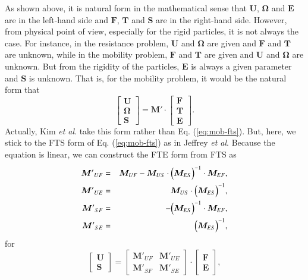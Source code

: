 \documentclass{book}
\begin{document}
As shown above, it is natural form in the mathematical sense
that $\bm{U}$, $\bm{\Omega}$ and $\bm{E}$ are in the left-hand side
and $\bm{F}$, $\bm{T}$ and $\bm{S}$ are in the right-hand side.
However, from physical point of view, especially for the rigid particles,
it is not always the case.
For instance, in the resistance problem,
$\bm{U}$ and $\bm{\Omega}$ are given and
$\bm{F}$ and $\bm{T}$ are unknown,
while in the mobility problem,
$\bm{F}$ and $\bm{T}$ are given and
$\bm{U}$ and $\bm{\Omega}$ are unknown.
But from the rigidity of the particles,
$\bm{E}$ is always a given parameter and
$\bm{S}$ is unknown.
That is, for the mobility problem, it would be the natural form that
\begin{equation}
  \left[
    \begin{array}{c}
      \bm{U}\\
      \bm{\Omega}\\
      \bm{S}
    \end{array}
  \right]
  =
  \bm{M}'
  \cdot
  \left[
    \begin{array}{c}
      \bm{F}\\
      \bm{T}\\
      \bm{E}
    \end{array}
  \right]
  .
\end{equation}
Actually, Kim {\it et al}.\cite{KimMifflin1985} take this form
rather than Eq. (\ref{eq:mob-fts}).
But, here, we stick to the FTS form of Eq. (\ref{eq:mob-fts})
as in Jeffrey {\it et al}.
Because the equation is linear,
we can construct the FTE form from FTS as
\begin{eqnarray}
  {\bm{M}'}_{UF}
  &=&
  \bm{M}_{UF}
  -
  \bm{M}_{US}
  \cdot
  \Bigl(
  \bm{M}_{ES}
  \Bigr)^{-1}
  \cdot
  \bm{M}_{EF}
  ,\\
  {\bm{M}'}_{UE}
  &=&
  \bm{M}_{US}
  \cdot
  \Bigl(
    \bm{M}_{ES}
  \Bigr)^{-1}
  ,\\
  {\bm{M}'}_{SF}
  &=&
  -
  \Bigl(
    \bm{M}_{ES}
  \Bigr)^{-1}
  \cdot
  \bm{M}_{EF}
  ,\\
  {\bm{M}'}_{SE}
  &=&
  \Bigl(
    \bm{M}_{ES}
  \Bigr)^{-1}
  ,
\end{eqnarray}
for
\begin{equation}
  \left[
    \begin{array}{c}
      \bm{U}\\
      \bm{S}
    \end{array}
  \right]
  =
  \left[
    \begin{array}{cc}
      {\bm{M}'}_{UF} & {\bm{M}'}_{UE}\\
      {\bm{M}'}_{SF} & {\bm{M}'}_{SE}
    \end{array}
  \right]
  \cdot
  \left[
    \begin{array}{c}
      \bm{F}\\
      \bm{E}
    \end{array}
  \right]
  ,
\end{equation}
\end{document}
